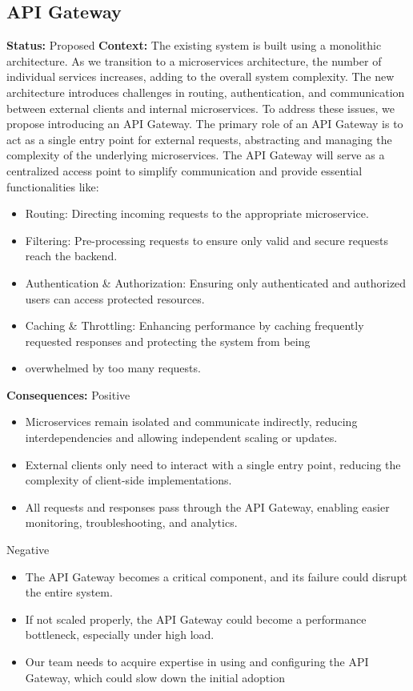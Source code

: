\subsection{API Gateway}
\textbf{Status:} Proposed
\newline
\newline
\textbf{Context:}
The existing system is built using a monolithic architecture. 
As we transition to a microservices architecture, the number of individual services increases, adding to the overall system complexity. 
The new architecture introduces challenges in routing, authentication, and communication between external clients and internal microservices.
To address these issues, we propose introducing an API Gateway. The primary role of an API Gateway is to act as a single entry point for external requests, abstracting and managing the complexity of the underlying microservices.
\newline
The API Gateway will serve as a centralized access point to simplify communication and provide essential functionalities like:
\begin{itemize}
    \item Routing: Directing incoming requests to the appropriate microservice.
    \item Filtering: Pre-processing requests to ensure only valid and secure requests reach the backend.
    \item Authentication \& Authorization: Ensuring only authenticated and authorized users can access protected resources.
    \item Caching \& Throttling: Enhancing performance by caching frequently requested responses and protecting the system from being 
    \item overwhelmed by too many requests.
\end{itemize}
\textbf{Consequences:}
\newline
\newline
Positive
\begin{itemize}
    \item Microservices remain isolated and communicate indirectly, reducing interdependencies and allowing independent scaling or updates.
    \item External clients only need to interact with a single entry point, reducing the complexity of client-side implementations.
    \item All requests and responses pass through the API Gateway, enabling easier monitoring, troubleshooting, and analytics.
\end{itemize}
Negative
\begin{itemize}
    \item The API Gateway becomes a critical component, and its failure could disrupt the entire system.
    \item If not scaled properly, the API Gateway could become a performance bottleneck, especially under high load.
    \item Our team needs to acquire expertise in using and configuring the API Gateway, which could slow down the initial adoption
\end{itemize}

